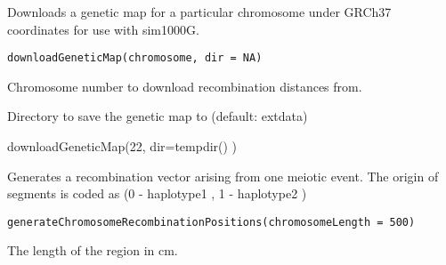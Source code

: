 \documentclass[letterpaper]{book}
\begin{document}
%
\begin{Description}\relax
Downloads a genetic map for a particular chromosome under GRCh37 coordinates for use with sim1000G.
\end{Description}
%
\begin{Usage}
\begin{verbatim}
downloadGeneticMap(chromosome, dir = NA)
\end{verbatim}
\end{Usage}
%
\begin{Arguments}
\begin{ldescription}
\item[\code{chromosome}] Chromosome number to download recombination distances from.

\item[\code{dir}] Directory to save the genetic map to (default: extdata)
\end{ldescription}
\end{Arguments}
%
\begin{Examples}
\begin{ExampleCode}



downloadGeneticMap(22, dir=tempdir() )


\end{ExampleCode}
\end{Examples}
%
\begin{Description}\relax
Generates a recombination vector arising from one meiotic event.
The origin of segments is coded as (0 - haplotype1 ,  1 - haplotype2 )
\end{Description}
%
\begin{Usage}
\begin{verbatim}
generateChromosomeRecombinationPositions(chromosomeLength = 500)
\end{verbatim}
\end{Usage}
%
\begin{Arguments}
\begin{ldescription}
\item[\code{chromosomeLength}] The length of the region in cm.
\end{ldescription}
\end{Arguments}
\end{document}

